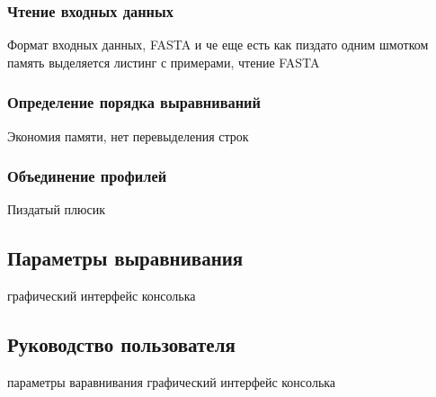 \subsubsection[Чтение входных данных]{\large Чтение входных данных}
\hspace{\parindent} Формат входных данных, FASTA и че еще есть
как пиздато одним шмотком память выделяется
листинг с примерами, чтение FASTA

\subsubsection[Определение порядка выравниваний]{\large Определение порядка выравниваний}
\hspace{\parindent} Экономия памяти, нет перевыделения строк

\subsubsection[Объединение профилей]{\large Объединение профилей}
\hspace{\parindent} Пиздатый плюсик

\subsection[Параметры выравнивания]{\large Параметры выравнивания}
\hspace{\parindent} графический интерфейс консолька

\subsection[Руководство пользователя]{\large Руководство пользователя}
\hspace{\parindent} параметры варавнивания графический интерфейс консолька